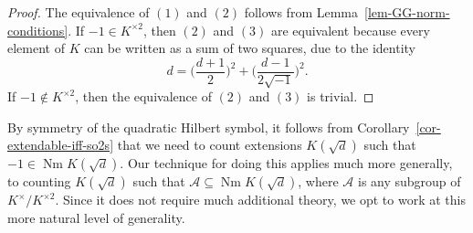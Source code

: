 \documentclass[11pt]{amsart}
\theoremstyle{theorem}
\theoremstyle{example}
\theoremstyle{definition}
\numberwithin{theorem}{section}
\numberwithin{theorem}{section}
\DeclareMathOperator{\Nm}{Nm}
\begin{document}
\begin{proof}
    The equivalence of $(1)$ and $(2)$ follows from Lemma~\ref{lem-GG-norm-conditions}. If $-1 \in K^{\times 2}$, then $(2)$ and $(3)$ are equivalent because every element of $K$ can be written as a sum of two squares, due to the identity 
    $$
    d = \Big(\frac{d + 1}{2}\Big)^2 + \Big(\frac{d - 1}{2\sqrt{-1}}\Big)^2.
    $$
    If $-1 \not \in K^{\times 2}$, then the equivalence of $(2)$ and $(3)$ is trivial.
\end{proof}

By symmetry of the quadratic Hilbert symbol, it follows from Corollary~\ref{cor-extendable-iff-so2s} that we need to count extensions $K(\sqrt{d})$ such that $-1 \in \Nm K(\sqrt{d})$. Our technique for doing this applies much more generally, to counting $K(\sqrt{d})$ such that $\mathcal{A}\subseteq \Nm K(\sqrt{d})$, where $\mathcal{A}$ is any subgroup of $K^\times / K^{\times 2}$. Since it does not require much additional theory, we opt to work at this more natural level of generality. 
\end{document}
